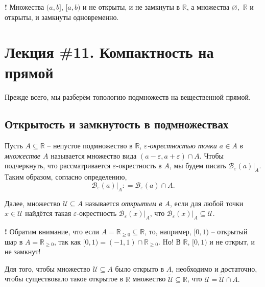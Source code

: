 \begin{mydanger}{\bf !}
    Множества $(a,b]$, $[a,b)$ и не открыты, и не замкнуты в $\mathbb{R}$, а множества $\varnothing,$ $\mathbb{R}$ и открыты, и замкнуты одновременно.
\end{mydanger}



\section{Лекция \#11. Компактность на прямой}

Прежде всего, мы разберём топологию подмножеств на вещественной прямой. 

\subsection{Открытость и замкнутость в подмножествах}

\begin{definition}\label{e-neigh_in_A}
    Пусть $A \subseteq \mathbb{R}$ -- непустое подмножество в $\mathbb{R}$, \textit{$\varepsilon$-окрестностью точки $a \in A$ в множестве $A$} называется множество вида $(a-\varepsilon, a+\varepsilon) \cap A$. Чтобы подчеркнуть, что рассматривается $\varepsilon$-окрестность в $A$, мы будем писать $\mathscr{B}_\varepsilon(a)|_A$. Таким образом, согласно определению,
    \[
     \mathscr{B}_\varepsilon(a)|_A: = \mathscr{B}_\varepsilon(a) \cap A.
     \]
 
Далее, множество $\mathscr{U} \subseteq A$ называется \textit{открытым в $A$}, если для любой точки $x \in \mathscr{U}$ найдётся такая $\varepsilon$-окрестность $\mathscr{B}_\varepsilon(x)|_A$, что $\mathscr{B}_\varepsilon(x)|_A \subseteq \mathscr{U}$.
 \end{definition}

\begin{mydanger}{\bf{!}}
    Обратим внимание, что если $A = \mathbb{R}_{\ge 0} \subseteq \mathbb{R}$, то, например, $[0,1)$ -- открытый шар в $A = \mathbb{R}_{\ge 0}$, так как $[0,1) = (-1,1) \cap \mathbb{R}_{\ge 0}$. Hо! В $\mathbb{R}$, $[0,1)$ и не открыт, и не замкнут!
\end{mydanger}

\begin{theorem}\label{open_in_K}
    Для того, чтобы множество $\mathscr{U} \subseteq A$ было открыто в $A$, необходимо и достаточно, чтобы существовало такое открытое в $\mathbb{R}$ множество $\widetilde{\mathscr{U}} \subseteq \mathbb{R}$, что $\mathscr{U} = \widetilde{\mathscr{U}}\cap A.$
\end{theorem}

